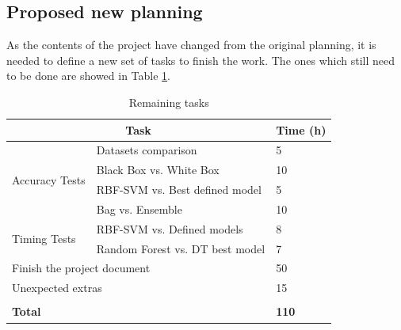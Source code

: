 \documentclass{article}
\begin{document}
    \subsection{Proposed new planning}

    

    As the contents of the project have changed from the original planning,
    it is needed to define a new set of tasks to finish the work. The ones which
    still need to be done are showed in Table \ref{tasks_table}.

    \begin{table}[]
     \begin{tabular}{|l|l|l|}
      \hline
      \multicolumn{2}{|c|}{\textbf{Task}}               & \textbf{Time (h)}                             \\ \hline
      \multirow{4}{*}{Accuracy Tests}                   & Datasets comparison             & 5           \\ \cline{2-3}
                                                        & Black Box vs. White Box         & 10          \\ \cline{2-3}
                                                        & RBF-SVM vs. Best defined model  & 5           \\ \cline{2-3}
                                                        & Bag vs. Ensemble                & 10          \\ \hline
      \multirow{2}{*}{Timing Tests}                     & RBF-SVM vs. Defined models      & 8           \\ \cline{2-3}
                                                        & Random Forest vs. DT best model & 7           \\ \hline
      \multicolumn{2}{|l|}{Finish the project document} & 50                                            \\ \hline
      \multicolumn{2}{|l|}{Unexpected extras}           & 15                                            \\ \hline
      \multicolumn{2}{|l|}{}                            &                                               \\ \hline
      \multicolumn{2}{|l|}{\textbf{Total}}              & \textbf{110}                                           \\ \hline
     \end{tabular}
    \caption{Remaining tasks}
    \label{tasks_table}
    \end{table}
\end{document}
